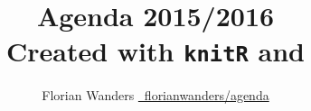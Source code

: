 \documentclass[11pt,a4paper]{book}\usepackage[]{graphicx}\usepackage[]{color}
\def\lsin{\lstinline[basicstyle=\ttfamily,breaklines=true,]} %for inline verbatim (knitr on title)
\begin{document}
\begin{titlepage}

\title{Agenda 2015/2016\\Created with \lsin{knitR} and \XeLaTeX} 
\author{\parbox{\linewidth}{%
  \centering%
  Florian Wanders\endgraf\bigskip
  \href{https://github.com/FlorianWanders/agenda}{\faGithub~florianwanders/agenda}
  }
}
\date{}
\maketitle





\end{titlepage}


\end{document}
